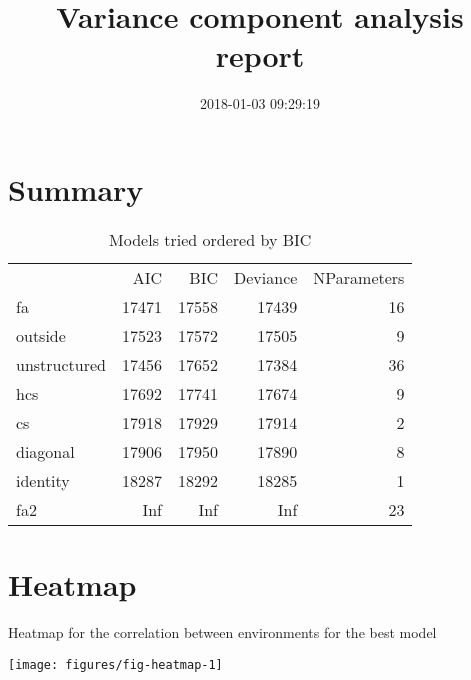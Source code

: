 \documentclass[a4paper,11pt]{article}\usepackage[]{graphicx}\usepackage[]{color}
\title{Variance component analysis report}%
\author{\vspace{-5ex}}
\date{2018-01-03 09:29:19}
\newenvironment{knitrout}{}{} %
\begin{document}


\maketitle
\singlespacing

\section{Summary}

\begin{table}[ht]
\begin{flushleft}
\caption{Models tried ordered by BIC} 
\label{summary}
\begin{tabular}{lrrrr}
  & AIC & BIC & Deviance & NParameters \\ 
 fa & 17471 & 17558 & 17439 & 16 \\ 
  outside & 17523 & 17572 & 17505 & 9 \\ 
  unstructured & 17456 & 17652 & 17384 & 36 \\ 
  hcs & 17692 & 17741 & 17674 & 9 \\ 
  cs & 17918 & 17929 & 17914 & 2 \\ 
  diagonal & 17906 & 17950 & 17890 & 8 \\ 
  identity & 18287 & 18292 & 18285 & 1 \\ 
  fa2 & Inf & Inf & Inf & 23 \\ 
  \end{tabular}
\end{flushleft}
\end{table}


\section{Heatmap}
Heatmap for the correlation between environments for the best model
\begin{knitrout}
\color{fgcolor}

\texttt{[image: figures/fig-heatmap-1]} \hfill{}



\end{knitrout}

\end{document}
